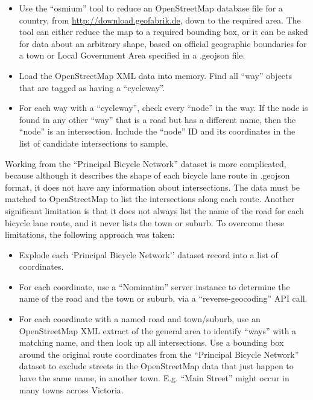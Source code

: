 \documentclass[11pt,twoside]{report}
\begin{document}
\begin{itemize}
\item{Use the ``osmium'' tool to reduce an OpenStreetMap database file for a country, from \url{http://download.geofabrik.de}, down to the required area.  The tool can either reduce the map to a required bounding box, or it can be asked for data about an arbitrary shape, based on official geographic boundaries for a town or Local Government Area specified in a .geojson file.}
\item{Load the OpenStreetMap XML data into memory.  Find all ``way'' objects that are tagged as having a ``cycleway''.}
\item{For each way with a ``cycleway'', check every ``node'' in the way.  If the node is found in any other ``way'' that is a road but has a different name, then the ``node'' is an intersection.  Include the ``node'' ID and its coordinates in the list of candidate intersections to sample.}
\end{itemize}

Working from the ``Principal Bicycle Network'' dataset is more complicated, because although it describes the shape of each bicycle lane route in .geojson format, it does not have any information about intersections.  The data must be matched to OpenStreetMap to list the intersections along each route.  Another significant limitation is that it does not always list the name of the road for each bicycle lane route, and it never lists the town or suburb.  To overcome these limitations, the following approach was taken:

\begin{itemize}
\item{Explode each `Principal Bicycle Network'' dataset record into a list of coordinates.}
\item{For each coordinate, use a ``Nominatim'' server instance to determine the name of the road and the town or suburb, via a ``reverse-geocoding'' API call.}
\item{For each coordinate with a named road and town/suburb, use an OpenStreetMap XML extract of the general area to identify ``ways'' with a matching name, and then look up all intersections.  Use a bounding box around the original route coordinates from the ``Principal Bicycle Network'' dataset to exclude streets in the OpenStreetMap data that just happen to have the same name, in another town.  E.g. ``Main Street'' might occur in many towns across Victoria.}
\end{itemize}
\end{document}
